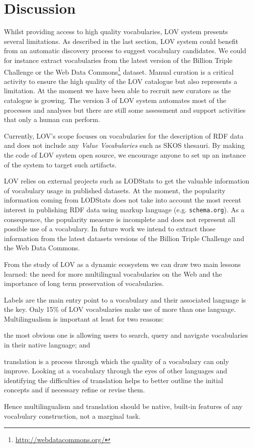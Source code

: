 \documentclass{iosart2c}
\begin{document}
\section{Discussion}\label{sec:discussion}
Whilst providing access to high quality vocabularies, LOV system presents several limitations. As described in the last section, LOV system could benefit from an automatic discovery process to suggest vocabulary candidates. We could for instance extract vocabularies from the latest version of the Billion Triple Challenge or the Web Data Commons\footnote{\url{http://webdatacommons.org/}} dataset. Manual curation is a critical activity to ensure the high quality of the LOV catalogue but also represents a limitation. At the moment we have been able to recruit new curators as the catalogue is growing. The version 3 of LOV system automates most of the processes and analyses but there are still some assessment and support activities that only a human can perform.

Currently, LOV's scope focuses on vocabularies for the description of RDF data and does not include any \emph{Value Vocabularies} such as SKOS thesauri. By making the code of LOV system open source, we encourage anyone to set up an instance of the system to target such artifacts. 

LOV relies on external projects such as LODStats to get the valuable information of vocabulary usage in published datasets. At the moment, the popularity information coming from LODStats does not take into account the most recent interest in publishing RDF data using markup language (e.g. \texttt{schema.org}). As a consequence, the popularity measure is incomplete and does not represent all possible use of a vocabulary. In future work we intend to extract those information from the latest datasets versions of the Billion Triple Challenge and the Web Data Commons.
 

From the study of LOV as a dynamic ecosystem we can draw two main lessons learned: the need for more multilingual vocabularies on the Web and the importance of long term preservation of vocabularies. 

Labels are the main entry point to a vocabulary and their associated language is the key. Only 15\% of LOV vocabularies make use of more than one language. Multilingualism is important at least for two reasons: 
\begin{inparaenum}[1)] 
	\item the most obvious one is allowing users to search, query and navigate vocabularies in their native language; and
	\item translation is a process through which the quality of a vocabulary can only improve. Looking at a vocabulary through the eyes of other languages and identifying the difficulties of translation helps to better outline the initial concepts and if necessary refine or revise them. 
\end{inparaenum} 
Hence multilingualism and translation should be native, built-in features of any vocabulary construction, not a marginal task. 
\end{document}
